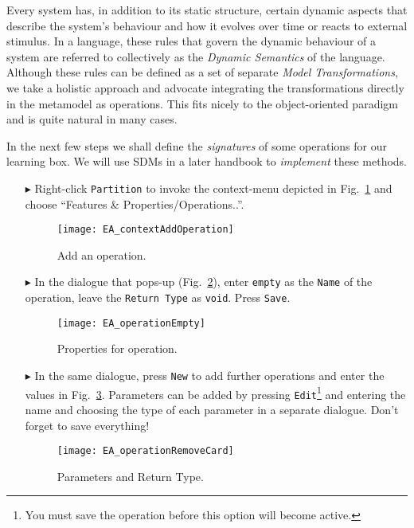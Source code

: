 Every system has, in addition to its static structure, certain dynamic aspects that describe the system's behaviour and how it evolves over time or reacts to external stimulus.
In a language, these rules that govern the dynamic behaviour of a system are referred to collectively as the \emph{Dynamic Semantics} of the language.
Although these rules can be defined as a set of separate \emph{Model Transformations}, we take a holistic approach and advocate integrating the transformations directly in the metamodel as operations.
This fits nicely to the object-oriented paradigm and is quite natural in many cases.

In the next few steps we shall define the \emph{signatures} of some operations for our learning box.
We will use SDMs in a later handbook to \emph{implement} these methods.
\begin{enumerate}
\item[$\blacktriangleright$] Right-click \texttt{Partition} to invoke the context-menu depicted in Fig.~\ref{fig:add_operation} and choose ``Features \& Properties/Operations..''.

\begin{figure}[htbp]
	\centering
  \texttt{[image: EA\_contextAddOperation]}
	\caption{Add an operation.}
	\label{fig:add_operation}
\end{figure}
\FloatBarrier

\item[$\blacktriangleright$] In the dialogue that pops-up (Fig.~\ref{fig:operation_properties}), enter \texttt{empty} as the \texttt{Name} of the operation, leave the \texttt{Return Type} as \texttt{void}.  Press \texttt{Save}.

\begin{figure}[htbp]
	\centering
  	\texttt{[image: EA\_operationEmpty]}
	\caption{Properties for operation.}
	\label{fig:operation_properties}
\end{figure}
\FloatBarrier

\item[$\blacktriangleright$] In the same dialogue, press \texttt{New} to add further operations and enter the values in Fig.~\ref{fig:operation_parameters}.  Parameters can be added by pressing \texttt{Edit}\footnote{You must save the operation before this option will become active.} and entering the name and choosing the type of each parameter in a separate dialogue. Don't forget to save everything!

\begin{figure}[htbp]
	\centering
  \texttt{[image: EA\_operationRemoveCard]}
	\caption{Parameters and Return Type.}
	\label{fig:operation_parameters}
\end{figure}
\FloatBarrier


\end{enumerate}
